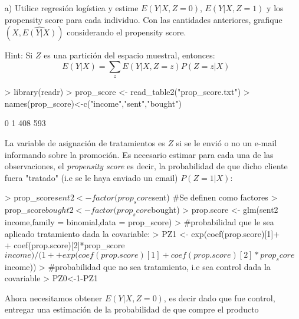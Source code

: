 \documentclass[11pt,onside]{article}
\begin{document}
\begin{itemize}

\item[a)] Utilice regresión logística y estime $E(Y\vert X,Z=0)$, $E(Y\vert X,Z=1)$ y los propensity score para cada individuo. Con las cantidades anteriores, grafique $(X,\widehat{E(Y\vert X)})$ considerando el propensity score.


Hint: Si $Z$ es una partición del espacio muestral, entonces:
$$E(Y\vert X)=\sum\limits_zE(Y\vert X,Z=z)P(Z=z\vert X)$$


\begin{Schunk}
\begin{Sinput}
> library(readr)
> prop_score <- read_table2("prop_score.txt")
> names(prop_score)<-c("income","sent","bought")
\end{Sinput}
\end{Schunk}

\begin{Schunk}
\begin{Soutput}
  0   1 
408 593 
\end{Soutput}
\end{Schunk}

La variable de asignación de tratamientos es $Z$ si se le envió o no un e-mail informando sobre la promoción. Es necesario estimar para cada una de las observaciones, el \textit{propensity score} es decir, la probabilidad de que dicho cliente fuera "tratado" (i.e se le haya enviado un email) $P(Z=1|X)$:


\begin{Schunk}
\begin{Sinput}
> prop_score$sent2<-factor(prop_score$sent)  #Se definen como factores
> prop_score$bought2<-factor(prop_score$bought)
> prop.score <- glm(sent2 ~ income,family = binomial,data = prop_score)
> #probabilidad que le sea aplicado tratamiento dada la covariable:
> PZ1 <- exp(coef(prop.score)[1]+
+                    coef(prop.score)[2]*prop_score$income)/(1+
+ exp(coef(prop.score)[1]+coef(prop.score)[2]*prop_score$income)) 
> #probabilidad que no sea tratamiento, i.e sea control dada la covariable
> PZ0<-1-PZ1  
\end{Sinput}
\end{Schunk}

Ahora necesitamos obtener $E(Y\vert X,Z=0)$, es decir dado que fue control, entregar una estimación de la probabilidad de que compre el producto


\end{itemize}
\end{document}
